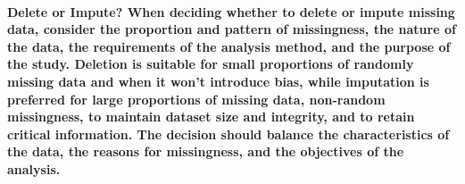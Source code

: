 \documentclass[11pt]{article} %
\begin{document}
\paragraph{\textbf{Delete or Impute?} When deciding whether to delete or impute missing data, consider the proportion and pattern of missingness, the nature of the data, the requirements of the analysis method, and the purpose of the study. Deletion is suitable for small proportions of randomly missing data and when it won't introduce bias, while imputation is preferred for large proportions of missing data, non-random missingness, to maintain dataset size and integrity, and to retain critical information. The decision should balance the characteristics of the data, the reasons for missingness, and the objectives of the analysis.}
% 
% 
% 
% 
% 
% 
% 
% 
% 
% 
% 
% 
% 
% 
% 
% 
% 
% 
% 
% 


% 
% 
% 
% 
% 
% 
% 
% 
\end{document}
